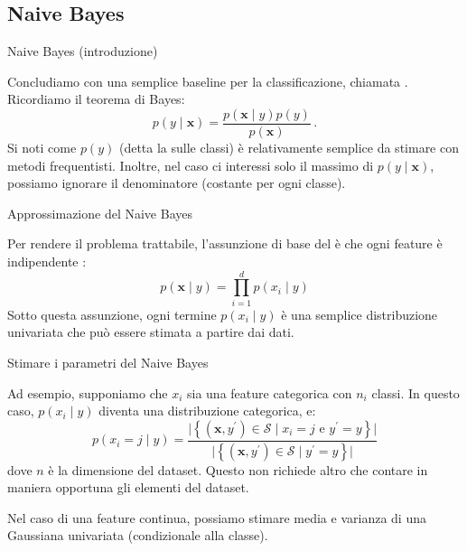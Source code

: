 \documentclass[12pt,aspectratio=169]{beamer}
\begin{document}
\subsection{Naive Bayes}

\begin{frame}{Naive Bayes (introduzione)}

	Concludiamo con una semplice baseline per la classificazione, chiamata .
	Ricordiamo il teorema di Bayes:
	\begin{equation}
		p(y \mid \mathbf{x}) = \frac{p(\mathbf{x} \mid y)p(y)}{p(\mathbf{x})} \,.
	\end{equation}
	Si noti come $p(y)$ (detta la  sulle classi) è relativamente semplice da stimare con metodi frequentisti. Inoltre, nel caso ci interessi solo il massimo di $p(y \mid \mathbf{x})$, possiamo ignorare il denominatore (costante per ogni classe).

\end{frame}

\begin{frame}[fragile]{Approssimazione del Naive Bayes}

	Per rendere il problema trattabile, l'assunzione di base del  è che ogni feature è indipendente :
	\begin{equation}
		p(\mathbf{x} \mid y) = \prod_{i=1}^d p(x_i \mid y)
	\end{equation}
	Sotto questa assunzione, ogni termine $p(x_i \mid y)$ è una semplice distribuzione univariata che può essere stimata a partire dai dati.

\end{frame}

\begin{frame}{Stimare i parametri del Naive Bayes}

	Ad esempio, supponiamo che $x_i$ sia una feature categorica con $n_i$ classi. In questo caso, $p(x_i \mid y)$ diventa una distribuzione categorica, e:
	\begin{equation}
		p(x_i = j \mid y) = \frac{\lvert \left\{ (\mathbf{x}, y^\prime) \in \mathcal{S} \mid x_i = j \text{ e } y^\prime = y \right\}\rvert}{\lvert \left\{ (\mathbf{x}, y^\prime) \in \mathcal{S} \mid y^\prime = y \right\}\rvert}
	\end{equation}
	dove $n$ è la dimensione del dataset. Questo non richiede altro che contare in maniera opportuna gli elementi del dataset.

	Nel caso di una feature continua, possiamo stimare media e varianza di una Gaussiana univariata (condizionale alla classe).

\end{frame}
\end{document}

